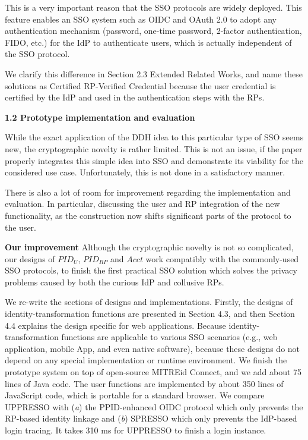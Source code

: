 \documentclass[letterpaper,onecolumn,10pt]{article}
\begin{document}
This is a very important reason that the SSO protocols are widely deployed.
This feature enables an SSO system such as OIDC and OAuth 2.0 to adopt any authentication mechanism
 (password, one-time password, 2-factor authentication, FIDO, etc.) for the IdP to authenticate users, which is actually independent of the SSO protocol.

We clarify this difference in Section 2.3 Extended Related Works,
    and name these solutions as Certified RP-Verified Credential
        because the user credential is certified by the IdP and used in the authentication steps with the RPs.


\vspace{1mm}\noindent\textbf{1.2 Prototype implementation and evaluation}

While the exact application of the DDH idea to this particular type of SSO seems new, the cryptographic novelty is rather limited.
This is not an issue, if the paper properly integrates this simple idea into SSO and demonstrate its viability for the considered use case.
Unfortunately, this is not done in a satisfactory manner.

There is also a lot of room for improvement regarding the implementation and evaluation.
In particular, discussing the user and RP integration of the new functionality, as the construction now shifts significant parts of the protocol to the user.


\vspace{1mm}\noindent\textbf{Our improvement}
Although the cryptographic novelty is not so complicated, 
        our designs of $PID_U$, $PID_{RP}$ and $Acct$ work compatibly with the commonly-used SSO protocols,
            to finish the first practical SSO solution which solves the privacy problems caused by both the curious IdP and collusive RPs.

We re-write the sections of designs and implementations.
Firstly,
    the designs of identity-transformation functions are presented in Section 4.3,
        and then Section 4.4 explains the design specific for web applications.
Because identity-transformation functions are applicable to various SSO scenarios
        (e.g., web application, mobile App, and even native software),
    because these designs do not depend on any special implementation or runtime environment.
We finish the prototype system on top of open-source MITREid Connect,
    and we add about 75 lines of Java code.
The user functions are implemented by about 350 lines of JavaScript code,
    which is portable for a standard browser.
We compare UPPRESSO with (\emph{a}) the PPID-enhanced OIDC protocol which only prevents the RP-based identity linkage
     and (\emph{b}) SPRESSO which only prevents the IdP-based login tracing.
It takes 310 ms for UPPRESSO to finish a login instance.
\end{document}

